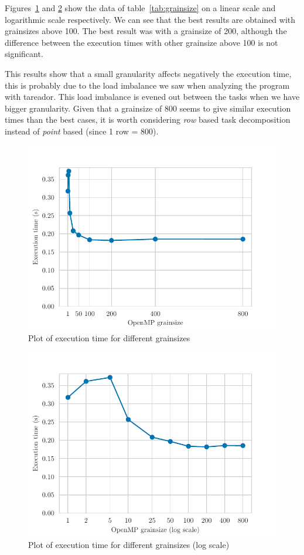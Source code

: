 Figures~\ref{fig:grain} and \ref{fig:grain_log} show the data of table~\ref{tab:grainsize} on a linear scale and logarithmic
scale respectively. We can see that the best results are obtained with grainsizes above 100. The best result was
with a grainsize of 200, although the difference between the execution times with other grainsize above 100 is not
significant.

This results show that a small granularity affects negatively the execution time, this
is probably due to the load imbalance we saw when analyzing the program with
tareador. This load imbalance is evened out between the tasks when we have bigger granularity.
Given that a grainsize of 800
seems to give similar execution times than the best cases, it is worth considering \emph{row} based task decomposition
instead of \emph{point} based (since 1 row = 800).

\begin{figure}[H]
    \centering
    \includegraphics{plots/grainsize.pdf}
    \caption{Plot of execution time for different grainsizes}
    \label{fig:grain} 
\end{figure}

\begin{figure}[H]
    \centering
    \includegraphics{plots/grainsize_log.pdf}
    \caption{Plot of execution time for different grainsizes (log scale)}
    \label{fig:grain_log} 
\end{figure}

